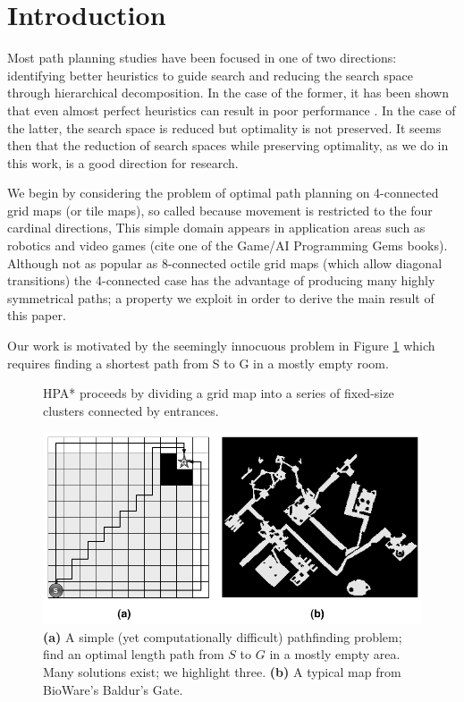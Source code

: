 \section{Introduction}
Most path planning studies have been focused in one of two directions: identifying better heuristics to 
guide search and reducing the search space through hierarchical decomposition.
In the case of the former, it has been shown that even almost perfect heuristics can result in poor 
performance \cite{malte08,korf98}. 
In the case of the latter, the search space is reduced but optimality is not preserved. 
It seems then that the reduction of search spaces while preserving optimality, as we do in this work, is a good direction for research.
\par
We begin by considering the problem of optimal path planning on 4-connected grid maps (or tile maps),
so called because movement is restricted to the four cardinal directions, 
This simple domain appears in application areas such as robotics \cite{latombe91} and video games 
(cite one of the Game/AI Programming Gems books).
Although not as popular as 8-connected octile grid maps (which allow diagonal transitions) the 4-connected case has 
the advantage of producing many highly symmetrical paths; 
a property we exploit in order to derive the main result of this paper.
\par 
Our work is motivated by the seemingly innocuous problem in Figure \ref{fig-emptymap} 
which requires finding a shortest path from S to G in a mostly empty room.
\begin{figure}[htbp]
HPA* \cite{botea04} proceeds by dividing a grid map into a series of fixed-size clusters connected 
by entrances.
	\vspace{-4pt}
       \begin{center}
                       \includegraphics[scale=0.30, trim = 20mm 20mm 20mm 0mm]{diagrams/emptymap.png}
       \end{center}
	\vspace{-3pt}
       \caption{\textbf{(a)} A simple (yet computationally difficult) pathfinding problem; find an 
optimal length path from $S$ to $G$ in a mostly empty area. 
Many solutions exist; we highlight three. 
\textbf{(b)} A typical map from BioWare's Baldur's Gate.}
       \label{fig-emptymap}
	\vspace{-12pt}
\end{figure}
